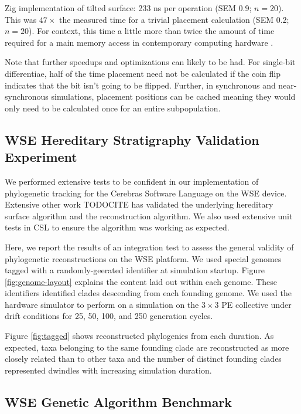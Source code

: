 Zig implementation of tilted surface:
233 ns per operation (SEM 0.9; $n=20$).
This was $47\times$ the measured time for a trivial placement calculation (SEM 0.2; $n=20$).
For context, this time a little more than twice the amount of time required for a main memory access in contemporary computing hardware \citep{markus2022memory}.

Note that further speedups and optimizations can likely to be had.
For single-bit differentiae, half of the time placement need not be calculated if the coin flip indicates that the bit isn't going to be flipped.
Further, in synchronous and near-synchronous simulations, placement positions can be cached meaning they would only need to be calculated once for an entire subpopulation.

\subsection{WSE Hereditary Stratigraphy Validation Experiment}

We performed extensive tests to be confident in our implementation of phylogenetic tracking for the Cerebras Software Language on the WSE device.
Extensive other work TODOCITE has validated the underlying hereditary surface algorithm and the reconstruction algorithm.
We also used extensive unit tests in CSL to ensure the algorithm was working as expected.

Here, we report the results of an integration test to assess the general validity of phylogenetic reconstructions on the WSE platform.
We used special genomes tagged with a randomly-geerated identifier at simulation startup.
Figure \ref{fig:genome-layout} explains the content laid out within each genome.
These identifiers identified clades descending from each founding genome.
We used the hardware simulator to perform on a simulation on the $3\times3$ PE collective under drift conditions for 25, 50, 100, and 250 generation cycles.



Figure \ref{fig:tagged} shows reconstructed phylogenies from each duration.
As expected, taxa belonging to the same founding clade are reconstructed as more closely related than to other taxa and the number of distinct founding clades represented dwindles with increasing simulation duration.

\subsection{WSE Genetic Algorithm Benchmark}

